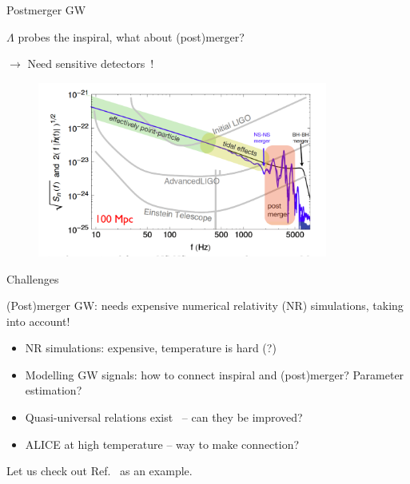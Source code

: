 \documentclass[usenames,dvipsnames,t]{beamer}
\begin{document}
\begin{frame}{Postmerger GW}

  \def\x{3mm}

  $\Lambda$ probes the inspiral, what about (post)merger?

  \quad $\rightarrow$ Need sensitive detectors~\cite{Maggiore:2019uih}!

  \begin{figure}[H]
    \centering
    \includegraphics[width=0.85\textwidth]{Figures/PSD-and-postmerger.png}
  \end{figure}
\end{frame}

\begin{frame}{Challenges}

  \def\x{4mm}

  (Post)merger GW: needs expensive numerical relativity (NR) simulations, taking  into account!

  \vspace{\x}

  \begin{itemize}
    \item NR simulations: expensive, temperature is hard (?)
    
    \vspace{\x}

    \item Modelling GW signals: how to connect inspiral and (post)merger? Parameter estimation?
    
    \vspace{\x}
    
    \item Quasi-universal relations exist~\cite{Tsang:2019esi} -- can they be improved?
    
    \vspace{\x}
    
    \item ALICE at high temperature -- way to make connection?
  \end{itemize}

  \vspace{\x}

  Let us check out Ref.~\cite{Fields_2023} as an example. 
\end{frame}
\end{document}
